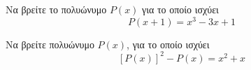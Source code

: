 \documentclass{presentation}
\begin{document}
\begin{askisi}
  Να βρείτε το πολυώνυμο $P(x)$ για το οποίο ισχύει
  $$P(x+1)=x^3-3x+1$$

\end{askisi}

\begin{askisi}
  Να βρείτε πολυώνυμο $P(x)$, για το οποίο ισχύει
  $$\left[ P(x) \right]^2-P(x)=x^2+x$$
\end{askisi}

\moodle
\end{document}
